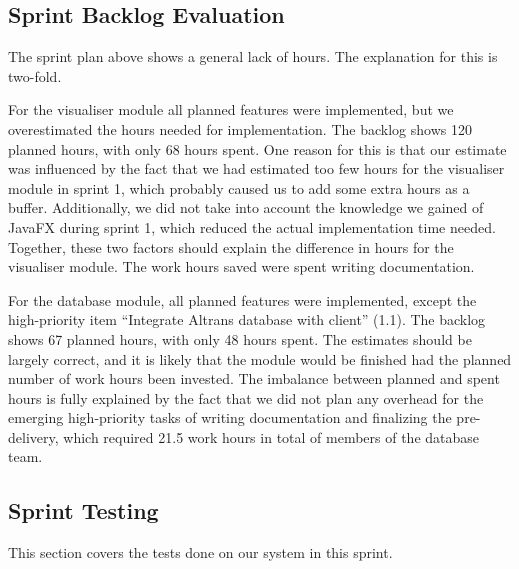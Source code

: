 \documentclass[../document]{subfiles}
\begin{document}
\newpage
\subsection{Sprint Backlog Evaluation}
The sprint plan above shows a general lack of hours. The explanation for this is two-fold.

For the visualiser module all planned features were implemented, but we overestimated the hours needed for implementation. The backlog shows 120 planned hours, with only 68 hours spent. One reason for this is that our estimate was influenced by the fact that we had estimated too few hours for the visualiser module in sprint 1, which probably caused us to add some extra hours as a buffer. Additionally, we did not take into account the knowledge we gained of \gls{JavaFX} during sprint 1, which reduced the actual implementation time needed. Together, these two factors should explain the difference in hours for the visualiser module. The work hours saved were spent writing documentation.

For the database module, all planned features were implemented, except the high-priority item “Integrate \gls{Altran}s database with client” (1.1). The backlog shows 67 planned hours, with only 48 hours spent. The estimates should be largely correct, and it is likely that the module would be finished had the planned number of work hours been invested. The imbalance between planned and spent hours is fully explained by the fact that we did not plan any overhead for the emerging high-priority tasks of writing documentation and finalizing the pre-delivery, which required 21.5 work hours in total of members of the database team.

\newpage
\subsection{Sprint Testing}
This section covers the tests done on our system in this sprint.
\end{document}
